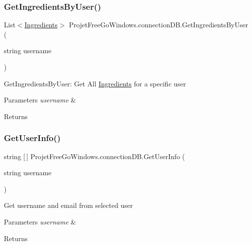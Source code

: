 \subsubsection{\texorpdfstring{Get\+Ingredients\+By\+User()}{GetIngredientsByUser()}}
{\footnotesize\ttfamily List$<$\hyperlink{class_projet_free_go_windows_1_1_ingredients}{Ingredients}$>$ Projet\+Free\+Go\+Windows.\+connection\+D\+B.\+Get\+Ingredients\+By\+User (\begin{DoxyParamCaption}\item[{string}]{username }\end{DoxyParamCaption})}



Get\+Ingredients\+By\+User\+: Get All \hyperlink{class_projet_free_go_windows_1_1_ingredients}{Ingredients} for a specific user 


\begin{DoxyParams}{Parameters}
{\em username} & \\
\hline
\end{DoxyParams}
\begin{DoxyReturn}{Returns}

\end{DoxyReturn}
\mbox{\label{class_projet_free_go_windows_1_1connection_d_b_ae017d427bfa452aaaaf4a096a1bdbe36}} 
\subsubsection{\texorpdfstring{Get\+User\+Info()}{GetUserInfo()}}
{\footnotesize\ttfamily string \mbox{[}$\,$\mbox{]} Projet\+Free\+Go\+Windows.\+connection\+D\+B.\+Get\+User\+Info (\begin{DoxyParamCaption}\item[{string}]{username }\end{DoxyParamCaption})}



Get username and email from selected user 


\begin{DoxyParams}{Parameters}
{\em username} & \\
\hline
\end{DoxyParams}
\begin{DoxyReturn}{Returns}

\end{DoxyReturn}
\mbox{\label{class_projet_free_go_windows_1_1connection_d_b_a0dcd082489031a2cd443b7e384905755}} 
